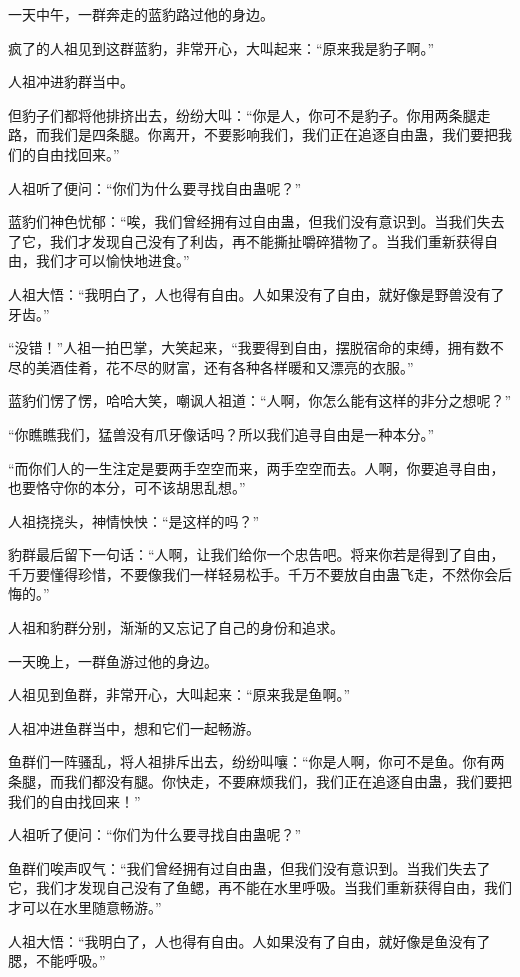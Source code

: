 \begin{this_body}
一天中午，一群奔走的蓝豹路过他的身边。

疯了的人祖见到这群蓝豹，非常开心，大叫起来：“原来我是豹子啊。”

人祖冲进豹群当中。

但豹子们都将他排挤出去，纷纷大叫：“你是人，你可不是豹子。你用两条腿走路，而我们是四条腿。你离开，不要影响我们，我们正在追逐自由蛊，我们要把我们的自由找回来。”

人祖听了便问：“你们为什么要寻找自由蛊呢？”

蓝豹们神色忧郁：“唉，我们曾经拥有过自由蛊，但我们没有意识到。当我们失去了它，我们才发现自己没有了利齿，再不能撕扯嚼碎猎物了。当我们重新获得自由，我们才可以愉快地进食。”

人祖大悟：“我明白了，人也得有自由。人如果没有了自由，就好像是野兽没有了牙齿。”

“没错！”人祖一拍巴掌，大笑起来，“我要得到自由，摆脱宿命的束缚，拥有数不尽的美酒佳肴，花不尽的财富，还有各种各样暖和又漂亮的衣服。”

蓝豹们愣了愣，哈哈大笑，嘲讽人祖道：“人啊，你怎么能有这样的非分之想呢？”

“你瞧瞧我们，猛兽没有爪牙像话吗？所以我们追寻自由是一种本分。”

“而你们人的一生注定是要两手空空而来，两手空空而去。人啊，你要追寻自由，也要恪守你的本分，可不该胡思乱想。”

人祖挠挠头，神情怏怏：“是这样的吗？”

豹群最后留下一句话：“人啊，让我们给你一个忠告吧。将来你若是得到了自由，千万要懂得珍惜，不要像我们一样轻易松手。千万不要放自由蛊飞走，不然你会后悔的。”

人祖和豹群分别，渐渐的又忘记了自己的身份和追求。

一天晚上，一群鱼游过他的身边。

人祖见到鱼群，非常开心，大叫起来：“原来我是鱼啊。”

人祖冲进鱼群当中，想和它们一起畅游。

鱼群们一阵骚乱，将人祖排斥出去，纷纷叫嚷：“你是人啊，你可不是鱼。你有两条腿，而我们都没有腿。你快走，不要麻烦我们，我们正在追逐自由蛊，我们要把我们的自由找回来！”

人祖听了便问：“你们为什么要寻找自由蛊呢？”

鱼群们唉声叹气：“我们曾经拥有过自由蛊，但我们没有意识到。当我们失去了它，我们才发现自己没有了鱼鳃，再不能在水里呼吸。当我们重新获得自由，我们才可以在水里随意畅游。”

人祖大悟：“我明白了，人也得有自由。人如果没有了自由，就好像是鱼没有了腮，不能呼吸。”


\end{this_body}
